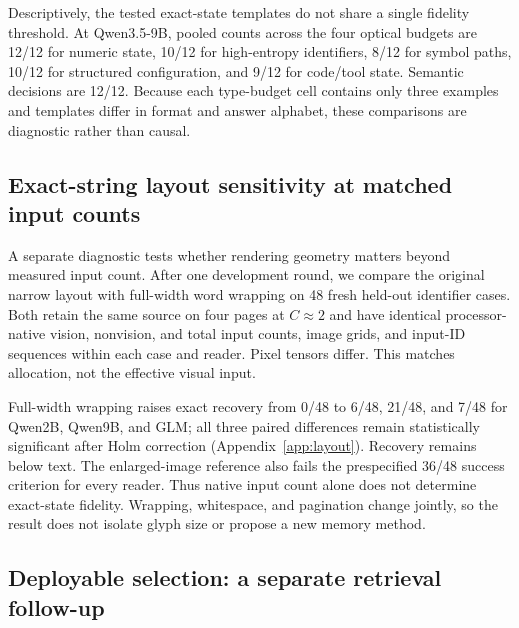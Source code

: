 \documentclass{article}
\begin{document}
Descriptively, the tested exact-state templates do not share a single fidelity threshold. At Qwen3.5-9B, pooled counts across the four optical budgets are 12/12 for numeric state, 10/12 for high-entropy identifiers, 8/12 for symbol paths, 10/12 for structured configuration, and 9/12 for code/tool state. Semantic decisions are 12/12. Because each type-budget cell contains only three examples and templates differ in format and answer alphabet, these comparisons are diagnostic rather than causal.

\subsection{Exact-string layout sensitivity at matched input counts}
\label{sec:layout}

A separate diagnostic tests whether rendering geometry matters beyond measured input count. After one development round, we compare the original narrow layout with full-width word wrapping on 48 fresh held-out identifier cases. Both retain the same source on four pages at $C\approx2$ and have identical processor-native vision, nonvision, and total input counts, image grids, and input-ID sequences within each case and reader. Pixel tensors differ. This matches allocation, not the effective visual input.

\begin{table}[!htbp]
  \centering\small
  \caption{Separate identifier diagnostic: exact matches out of 48 held-out cases. The two $C\approx2$ layouts are input-count-matched; enlarged images and full text are larger-budget references. These cases are not pooled with the 18-episode pilot.}
  \label{tab:layout}
  
\end{table}

Full-width wrapping raises exact recovery from 0/48 to 6/48, 21/48, and 7/48 for Qwen2B, Qwen9B, and GLM; all three paired differences remain statistically significant after Holm correction (Appendix~\ref{app:layout}). Recovery remains below text. The enlarged-image reference also fails the prespecified 36/48 success criterion for every reader. Thus native input count alone does not determine exact-state fidelity. Wrapping, whitespace, and pagination change jointly, so the result does not isolate glyph size or propose a new memory method.

\subsection{Deployable selection: a separate retrieval follow-up}
\label{sec:followup}
\end{document}

